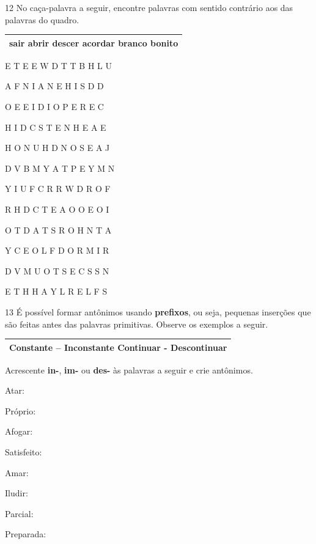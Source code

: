 \num{12} No caça-palavra a seguir, encontre palavras com sentido contrário aos das
palavras do quadro.

\begin{longtable}[]{@{}l@{}}
\toprule
\textbf{sair abrir descer acordar branco bonito}\tabularnewline
\bottomrule
\end{longtable}

E T E E W D T T B H L U

A F N I A N E H I S D D

O E E I D I O P E R E C

H I D C S T E N H E A E

H O N U H D N O S E A J

D V B M Y A T P E Y M N

Y I U F C R R W D R O F

R H D C T E A O O E O I

O T D A T S R O H N T A

Y C E O L F D O R M I R

D V M U O T S E C S S N

E T H H A Y L R E L F S

\num{13} É possível formar antônimos usando \textbf{prefixos}, ou seja, pequenas inserções
que são feitas antes das palavras primitivas. Observe os exemplos a seguir.

\begin{longtable}[]{@{}l@{}}
\toprule
Constante -- \textbf{In}constante Continuar -
\textbf{Des}continuar\tabularnewline
\bottomrule
\end{longtable}

Acrescente \textbf{in-}, \textbf{im-} ou \textbf{des-} às palavras a seguir e crie antônimos.

\begin{escolha}
\item Atar: 

\item Próprio: 

\item Afogar: 

\item Satisfeito: 

\item Amar: 

\item Iludir: 

\item Parcial: 

\item Preparada: 
\end{escolha}

